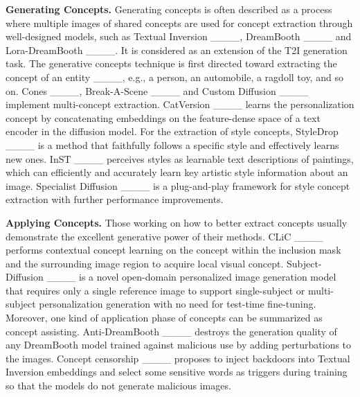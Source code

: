 \textbf{Generating Concepts.} Generating concepts is often described as a process where multiple images of shared concepts are used for concept extraction through well-designed models, such as Textual Inversion ____, DreamBooth ____ and Lora-DreamBooth ____. It is considered as an extension of the T2I generation task. The generative concepts technique is first directed toward extracting the concept of an entity ____, e.g., a person, an automobile, a ragdoll toy, and so on. Cones ____, Break-A-Scene ____ and Custom Diffusion ____ implement multi-concept extraction. CatVersion ____ learns the personalization concept by concatenating embeddings on the feature-dense space of a text encoder in the diffusion model. For the extraction of style concepts, StyleDrop ____ is a method that faithfully follows a specific style and effectively learns new ones. InST ____ perceives styles as learnable text descriptions of paintings, which can efficiently and accurately learn key artistic style information about an image. Specialist Diffusion ____ is a plug-and-play framework for style concept extraction with further performance improvements.

\textbf{Applying Concepts.} Those working on how to better extract concepts usually demonstrate the excellent generative power of their methods. CLiC ____ performs contextual concept learning on the concept within the inclusion mask and the surrounding image region to acquire local visual concept. Subject-Diffusion ____ is a novel open-domain personalized image generation model that requires only a single reference image to support single-subject or multi-subject personalization generation with no need for test-time fine-tuning. Moreover, one kind of application phase of concepts can be summarized as concept assisting. Anti-DreamBooth ____ destroys the generation quality of any DreamBooth model trained against malicious use by adding perturbations to the images. Concept censorship ____ proposes to inject backdoors into Textual Inversion embeddings and select some sensitive words as triggers during training so that the models do not generate malicious images.